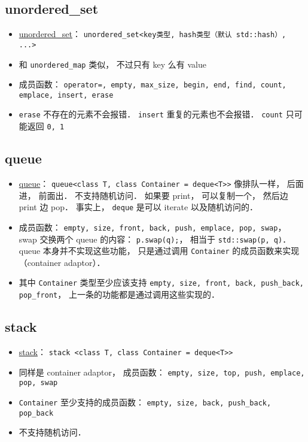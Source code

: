 \subsection{unordered_set}
\begin{itemize}
\item \href{https://cplusplus.com/reference/unordered_set/unordered_set/}{unordered_set}： \verb|unordered_set<key类型, hash类型（默认 std::hash）, ...>|
\item 和 \verb|unordered_map| 类似， 不过只有 key 么有 value
\item 成员函数： \verb|operator=, empty, max_size, begin, end, find, count, emplace, insert, erase|
\item \verb|erase| 不存在的元素不会报错． \verb|insert| 重复的元素也不会报错． \verb|count| 只可能返回 \verb|0, 1|
\end{itemize}

\subsection{queue}
\begin{itemize}
\item \href{https://cplusplus.com/reference/queue/queue/}{queue}： \verb|queue<class T, class Container = deque<T>>| 像排队一样， 后面进， 前面出． 不支持随机访问． 如果要 print， 可以复制一个， 然后边 print 边 pop． 事实上， \verb|deque| 是可以 iterate 以及随机访问的．
\item 成员函数： \verb|empty, size, front, back, push, emplace, pop, swap|， swap 交换两个 queue 的内容： \verb|p.swap(q);|， 相当于 \verb|std::swap(p, q)|． queue 本身并不实现这些功能， 只是通过调用 \verb|Container| 的成员函数来实现（container adaptor）．
\item 其中 \verb|Container| 类型至少应该支持 \verb|empty, size, front, back, push_back, pop_front|， 上一条的功能都是通过调用这些实现的．
\end{itemize}

\subsection{stack}
\begin{itemize}
\item \href{https://cplusplus.com/reference/stack/stack/}{stack}： \verb|stack <class T, class Container = deque<T>>|
\item 同样是 container adaptor， 成员函数： \verb|empty, size, top, push, emplace, pop, swap|
\item \verb|Container| 至少支持的成员函数： \verb|empty, size, back, push_back, pop_back|
\item 不支持随机访问．
\end{itemize}

